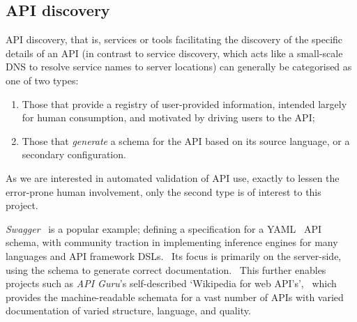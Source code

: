 \subsection{API discovery} \label{soln:api-discovery}

API discovery, that is, services or tools facilitating the discovery of the specific details of an API (in contrast to service discovery, which acts like a small-scale DNS to resolve service names to server locations) can generally be categorised as one of two types:

\begin{enumerate}
\item Those that provide a registry of user-provided information, intended largely for human consumption, and motivated by driving users to the API;
\item Those that \emph{generate} a schema for the API based on its source language, or a secondary configuration.
\end{enumerate}

As we are interested in automated validation of API use, exactly to lessen the error-prone human involvement, only the second type is of interest to this project.

\emph{Swagger}~\cite{swagger} is a popular example; defining a specification for a YAML~\cite{yaml} API schema, with community traction in implementing inference engines for many languages and API framework DSLs.~\cite{swagger_oss} Its focus is primarily on the server-side, using the schema to generate correct documentation.~ This further enables projects such as \emph{API Guru}'s self-described `Wikipedia for web API's',~\cite{apisguru_oas_directory} which provides the machine-readable schemata for a vast number of APIs with varied documentation of varied structure, language, and quality.